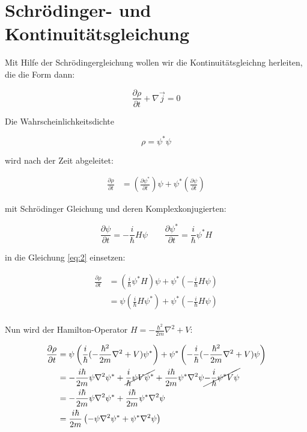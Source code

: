 



\section*{Schrödinger- und Kontinuitätsgleichung}

Mit Hilfe der Schrödingergleichung wollen wir die Kontinuitätsgleichng herleiten, die die Form dann:

\begin{equation}
  \label{eq:1}
  \frac{\partial \rho}{\partial t} + \nabla \vec j = 0
\end{equation}

Die Wahrscheinlichkeitsdichte 

\[ \rho = \psi^*\psi \]

wird nach der Zeit abgeleitet:

\begin{align}
\frac{\partial \rho}{\partial t} &= \left(\frac{\partial \psi^*}{\partial t}\right)\psi + \psi^*\left(\frac{\partial \psi}{\partial t}\right) \label{eq:2}
\end{align}

mit Schrödinger Gleichung und deren Komplexkonjugierten:

\[ \frac{\partial \psi}{\partial t} = -\frac{i}{\hbar}H\psi \qquad \frac{\partial \psi^*}{\partial t} = \frac{i}{\hbar}\psi^* H   \]

in die Gleichung \eqref{eq:2} einsetzen:

\begin{align}
\frac{\partial \rho}{\partial t} &= \left( \frac{i}{\hbar}\psi^* H  \right)\psi + \psi^*\left( -\frac{i}{\hbar}H\psi \right)\\
&= \psi \left( \frac{i}{\hbar}H\psi^*  \right) + \psi^*\left( -\frac{i}{\hbar}H\psi \right)\\
\end{align}

Nun wird der Hamilton-Operator \( H = -\frac{\hbar^2}{2m}\nabla^2 + V\):

\begin{align}
\frac{\partial \rho}{\partial t} &= \psi \left( \frac{i}{\hbar}( -\frac{\hbar^2}{2m}\nabla^2 + V ) \psi^* \right) + \psi^*\left( -\frac{i}{\hbar}(-\frac{\hbar^2}{2m}\nabla^2 + V  )\psi \right)\\
&=  - \frac{i\hbar}{2m} \psi \nabla^2\psi^* +\cancel{ \frac{i}{\hbar}\psi V \psi^*} + \frac{i\hbar}{2m} \psi^* \nabla^2\psi \cancel{- \frac{i}{\hbar}\psi^* V\psi} \\
&=  - \frac{i\hbar}{2m} \psi \nabla^2\psi^* + \frac{i\hbar}{2m} \psi^* \nabla^2\psi\\
&= \frac{i\hbar}{2m} \left(-\psi \nabla^2\psi^* + \psi^* \nabla^2\psi\right) \label{eq:4}
\end{align}

